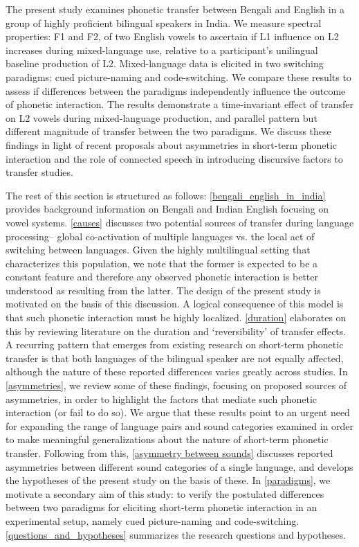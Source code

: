 \documentclass[12 pt]{article}
\begin{document}
The present study examines phonetic transfer between Bengali and English in a group of highly proficient bilingual speakers in India. We measure spectral properties: F1 and F2, of two English vowels to ascertain if L1 influence on L2 increases during mixed-language use, relative to a participant's unilingual baseline production of L2. Mixed-language data is elicited in two switching paradigms: cued picture-naming and code-switching. We compare these results to assess if differences between the paradigms independently influence the outcome of phonetic interaction. The results demonstrate a time-invariant effect of transfer on L2 vowels during mixed-language production, and parallel pattern but different magnitude of transfer between the two paradigms. We discuss these findings in light of recent proposals about asymmetries in short-term phonetic interaction and the role of connected speech in introducing discursive factors to transfer studies.


The rest of this section is structured as follows: \ref{bengali_english_in_india} provides background information on Bengali and Indian English focusing on vowel systems. \ref{causes} discusses two potential sources of transfer during language processing-- global co-activation of multiple languages vs. the local act of switching between languages. Given the highly multilingual setting that characterizes this population, we note that the former is expected to be a constant feature and therefore any observed phonetic interaction is better understood as resulting from the latter. The design of the present study is motivated on the basis of this discussion. A logical consequence of this model is that such phonetic interaction must be highly localized. \ref{duration} elaborates on this by reviewing literature on the duration and `reversibility' of transfer effects. A recurring pattern that emerges from existing research on short-term phonetic transfer is that both languages of the bilingual speaker are not equally affected, although the nature of these reported differences varies greatly across studies. In \ref{asymmetries}, we review some of these findings, focusing on proposed sources of asymmetries, in order to highlight the factors that mediate such phonetic interaction (or fail to do so). We argue that these results point to an urgent need for expanding the range of language pairs and sound categories examined in order to make meaningful generalizations about the nature of short-term phonetic transfer. Following from this, \ref{asymmetry between sounds} discusses reported asymmetries between different sound categories of a single language, and develops the hypotheses of the present study on the basis of these. In \ref{paradigms}, we motivate a secondary aim of this study: to verify the postulated differences between two paradigms for eliciting short-term phonetic interaction in an experimental setup, namely cued picture-naming and code-switching. \ref{questions_and_hypotheses} summarizes the research questions and hypotheses.
\end{document}

